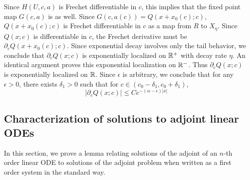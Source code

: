 \documentclass[thesis.tex]{subfiles}
\begin{document}
Since $H(U, c, a)$ is Frechet differentiable in $c$, this implies that the fixed point map $G(c, a)$ is as well. Since $G(c, a(c)) = Q(x + x_0(c); c)$, $Q(x + x_0(c); c)$ is Frechet differentiable in $c$ as a map from $R$ to $X_\eta$. Since $Q(x; c)$ is differentiable in $c$, the Frechet derivative must be $\partial_c Q(x + x_0(c); c)$. Since exponential decay involves only the tail behavior, we conclude that $\partial_c Q(x; c)$ is exponentially localized on $\mathbb{R}^+$ with decay rate $\eta$. An identical argument proves this exponential localization on $\mathbb{R}^-$. Thus $\partial_c Q(x; c)$ is exponentially localized on $\mathbb{R}$. Since $\epsilon$ is arbitrary, we conclude that for any $\epsilon > 0$, there exists $\delta_1 > 0$ such that for $c \in (c_0 - \delta_1, c_0 + \delta_1)$,
\[
|\partial_c Q(x; c)| \leq C e^{-(\alpha - \epsilon)|x|}
\] 

\subsection{Characterization of solutions to adjoint linear ODEs}

In this section, we prove a lemma relating solutions of the adjoint of an $n$-th order linear ODE to solutions of the adjoint problem when written as a first order system in the standard way.
\end{document}
